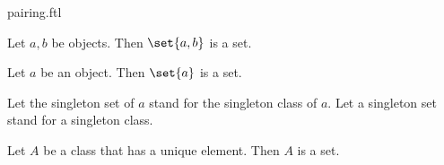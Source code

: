 \documentclass{naproche-library}
\begin{document}
\begin{smodule}[title=The Pairing Axiom]{pairing.ftl}

\begin{axiom}[forthel,title=Pairing Axiom,id=FOUNDATIONS_10_7376893816864768]
  Let $a, b$ be objects.
  Then $\set{a, b}$ is a set.
\end{axiom}

\begin{proposition}[forthel,id=FOUNDATIONS_10_7556516257202176]
  Let $a$ be an object.
  Then $\set{a}$ is a set.
\end{proposition}

\begin{forthel}
  Let the singleton set of $a$ stand for the singleton class of $a$.
  Let a singleton set stand for a singleton class.
\end{forthel}

\begin{corollary}[forthel,id=FOUNDATIONS_10_8408517115379712]
  Let $A$ be a class that has a unique element.
  Then $A$ is a set.
\end{corollary}
\end{smodule}
\end{document}

